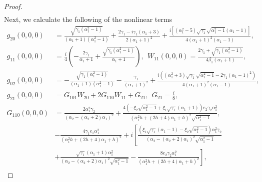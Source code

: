 \documentclass{ws-ijbc}
\begin{document}
\begin{proof}
{\begin{equation*}
\begin{aligned}
                              \end{aligned}
\end{equation*}}
Next, we calculate the following of the nonlinear terms
\begin{align*}
g_{20}(0,0,0)&=\frac{\sqrt{\gamma_{1} \left(\alpha_{1}^{2}-1\right)}}{\left(\alpha_{1}+1\right) \left(\alpha_{1}^{2}-1\right)}+\frac{2\gamma_{1}-i\gamma_{1} \left(\alpha_{1}+3\right) }{2\left(\alpha_{1}+1\right)^{2}}+\frac{i\left[\left(\alpha_{1}^{2}-5\right) \sqrt{\gamma_{1}}\sqrt{\alpha_{1}^{2}-1}\left(\alpha_{1}-1\right)\right]}{4 \left(\alpha_{1}+1\right)^{2} \left(\alpha_{1}-1\right)},\\
g_{11}(0,0,0)&=\frac{i}{4} \left(-\frac{2 \gamma_{1}}{\alpha_{1}+1}+\frac{\sqrt{\gamma_{1} \left(\alpha_{1}^{2}-1\right)}}{\alpha_{1}+1}\right),~~W_{11}(0,0,0)=\frac{2 \gamma_{1}+\sqrt{\gamma_{1} \left(\alpha_{1}^{2}-1\right)}}{4 \beta_{1} \left(\alpha_{1}+1\right)},\\
g_{02}(0,0,0)&=-\frac{\sqrt{\gamma_{1} \left(\alpha_{1}^{2}-1\right)}}{\left(\alpha_{1}+1\right) \left(\alpha_{1}^{2}-1\right)}-\frac{\gamma_{1}}{\left(\alpha_{1}+1\right)^{2}}+\frac{i \left(\left(\alpha_{1}^{2}+3\right) \sqrt{\gamma_{1}}\sqrt{\alpha_{1}^{2}-1}-2 \gamma_{1} \left(\alpha_{1}-1\right)^{2}\right)}{4 \left(\alpha_{1}+1\right)^{2} \left(\alpha_{1}-1\right)},\\
g_{21}(0,0,0)&=G_{101} W_{20}+2 G_{110} W_{11}+G_{21},~~G_{21}=\frac{i}{8},\\
G_{110}(0,0,0)&=\frac{2 \alpha_{1}^{2} \gamma_{2}}{\left(\alpha_{2}-\left(\alpha_{2}+2\right) \alpha_{1}\right)^{2}}+\frac{4 \left(-\xi_{2} \sqrt{\alpha_{1}^{2}-1}+\xi_{1} \sqrt{\gamma_{1}} \left(\alpha_{1}+1\right)\right) e_{2} \gamma_{2} \alpha_{1}^{2}}{\left(\alpha_{1}^{2} h +\left(2 h +4\right) \alpha_{1}+h \right)^{2} \sqrt{\alpha_{1}^{2}-1}},\\
&-\frac{4 \gamma_{1} e_{1} \alpha_{1}^{2}}{\left(\alpha_{1}^{2} h +\left(2 h +4\right) \alpha_{1}+h \right)^{2}}
+i\left[\frac{(\xi_{1} \sqrt{\gamma_{1}}\left(\alpha_{1}-1\right)-\xi_{2} \sqrt{\alpha_{1}^{2}-1}) \alpha_{1}^{2} \gamma_{2}}{\left(\alpha_{2}-\left(\alpha_{2}+2\right) \alpha_{1}\right)^{2} \sqrt{\alpha_{1}^{2}-1}}\right.\\
&\left.+\frac{\sqrt{\gamma_{1}} \left(\alpha_{1}+1\right) \alpha_{1}^{2}}{\left(\alpha_{2}-\left(\alpha_{2}+2\right) \alpha_{1}\right)^{2} \sqrt{\alpha_{1}^{2}-1}}-\frac{8 e_{2} \gamma_{2} \alpha_{1}^{2}}{\left(\alpha_{1}^{2} h +\left(2 h +4\right) \alpha_{1}+h \right)^{2}}\right],\\

\end{align*}
\end{proof}
\end{document}
